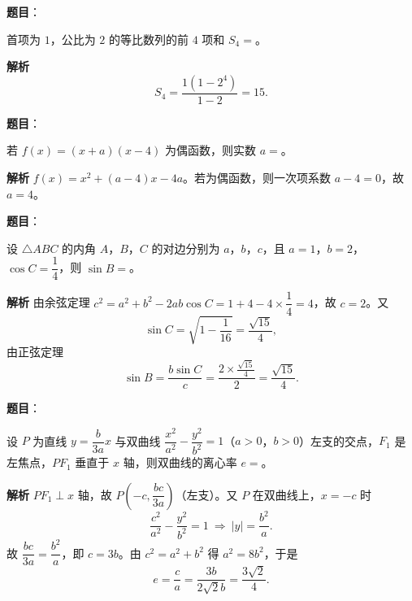 \begin{answer}

\textbf{题目}：

首项为 $1$，公比为 $2$ 的等比数列的前 $4$ 项和 $S_4=$\gkblank{}。

\textbf{解析}
\nopagebreak[4]
\[S_4=\frac{1(1-2^4)}{1-2}=15.\]


\end{answer}
\begin{answer}

\textbf{题目}：

若 $f(x)=(x+a)(x-4)$ 为偶函数，则实数 $a=$\gkblank{}。

\textbf{解析}
$f(x)=x^2+(a-4)x-4a$。若为偶函数，则一次项系数 $a-4=0$，故 $a=4$。


\end{answer}
\begin{answer}

\textbf{题目}：

设 $\triangle ABC$ 的内角 $A$，$B$，$C$ 的对边分别为 $a$，$b$，$c$，且 $a=1$，$b=2$，$\cos C=\dfrac14$，则 $\sin B=$\gkblank{}。

\textbf{解析}
由余弦定理 $c^2=a^2+b^2-2ab\cos C=1+4-4\times\dfrac14=4$，故 $c=2$。又
\nopagebreak[4]
\[\sin C=\sqrt{1-\frac1{16}}=\frac{\sqrt{15}}4,\]
由正弦定理
\nopagebreak[4]
\[\sin B=\frac{b\sin C}c=\frac{2\times\frac{\sqrt{15}}4}2=\frac{\sqrt{15}}4.\]


\end{answer}
\begin{answer}

\textbf{题目}：

设 $P$ 为直线 $y=\dfrac b{3a}x$ 与双曲线 $\dfrac{x^2}{a^2}-\dfrac{y^2}{b^2}=1$（$a>0$，$b>0$）左支的交点，$F_1$ 是左焦点，$PF_1$ 垂直于 $x$ 轴，则双曲线的离心率 $e=$\gkblank{}。

\textbf{解析}
$PF_1\perp x$ 轴，故 $P\left(-c,\dfrac{bc}{3a}\right)$（左支）。又 $P$ 在双曲线上，$x=-c$ 时
\nopagebreak[4]
\[\frac{c^2}{a^2}-\frac{y^2}{b^2}=1\ \Rightarrow\ |y|=\frac{b^2}a.\]
故 $\dfrac{bc}{3a}=\dfrac{b^2}a$，即 $c=3b$。由 $c^2=a^2+b^2$ 得 $a^2=8b^2$，于是
\nopagebreak[4]
\[e=\frac ca=\frac{3b}{2\sqrt2b}=\frac{3\sqrt2}4.\]


\end{answer}
